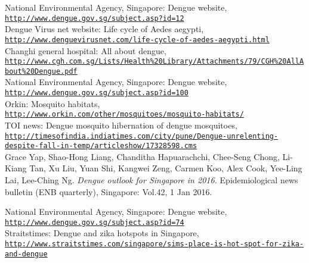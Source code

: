 \documentclass[11pt]{exam}
\begin{document}
\begin{thebibliography}{28}
National Environmental Agency, Singapore: Dengue website, 
\\\texttt{\url{http://www.dengue.gov.sg/subject.asp?id=12}}\\

Dengue Virus net website: Life cycle of Aedes aegypti,
\\\texttt{\url{http://www.denguevirusnet.com/life-cycle-of-aedes-aegypti.html}}\\
 
Changhi general hospital: All about dengue,
\\\texttt{\url{http://www.cgh.com.sg/Lists/Health\%20Library/Attachments/79/CGH\%20AllAbout\%20Dengue.pdf}
} \\
 
National Environmental Agency, Singapore: Dengue website, 
\\\texttt{\url{http://www.dengue.gov.sg/subject.asp?id=100}}\\
 
Orkin: Mosquito habitats,
\\\texttt{\url{http://www.orkin.com/other/mosquitoes/mosquito-habitats/}}\\
 
TOI news: Dengue mosquito hibernation of dengue mosquitoes,
\\\texttt{\url{http://timesofindia.indiatimes.com/city/pune/Dengue-unrelenting-despite-fall-in-temp/articleshow/17328598.cms}}\\
 
Grace Yap, Shao-Hong Liang, Chanditha Hapuarachchi, Chee-Seng Chong, Li-Kiang Tan, Xu Liu, Yuan Shi, Kangwei Zeng, Carmen Koo, Alex Cook, Yee-Ling Lai, Lee-Ching Ng.
\textit{Dengue outlook for Singapore in 2016.}
Epidemiological news bulletin (ENB quarterly), Singapore: Vol.42, 1 Jan 2016.

National Environmental Agency, Singapore: Dengue website,
\\\texttt{\url{http://www.dengue.gov.sg/subject.asp?id=74}}\\
 
Straitstimes: Dengue and zika hotspots in Singapore, 
\\\texttt{\url{http://www.straitstimes.com/singapore/sims-place-is-hot-spot-for-zika-and-dengue}}\\
 

\end{thebibliography}
\end{document}
